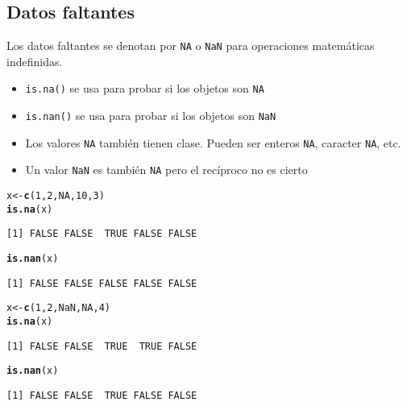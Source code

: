 \documentclass{article}\usepackage[]{graphicx}\usepackage[]{color}
\makeatletter
\newcommand{\hlnum}[1]{\textcolor[rgb]{0.686,0.059,0.569}{#1}}%
\newcommand{\hlstd}[1]{\textcolor[rgb]{0.345,0.345,0.345}{#1}}%
\newcommand{\hlkwb}[1]{\textcolor[rgb]{0.69,0.353,0.396}{#1}}%
\newcommand{\hlkwd}[1]{\textcolor[rgb]{0.737,0.353,0.396}{\textbf{#1}}}%
\newenvironment{kframe}{%
 \def\at@end@of@kframe{}%
 \ifinner\ifhmode%
  \def\at@end@of@kframe{\end{minipage}}%
  \begin{minipage}{\columnwidth}%
 \fi\fi%
 \def\FrameCommand##1{\hskip\@totalleftmargin \hskip-\fboxsep
 \colorbox{shadecolor}{##1}\hskip-\fboxsep
     \hskip-\linewidth \hskip-\@totalleftmargin \hskip\columnwidth}%
 \MakeFramed {\advance\hsize-\width
   \@totalleftmargin\z@ \linewidth\hsize
   \@setminipage}}%
 {\par\unskip\endMakeFramed%
 \at@end@of@kframe}
\newenvironment{knitrout}{}{} %
\makeatother
\begin{document}
  \subsection{Datos faltantes}
    Los datos faltantes se denotan por \texttt{NA} o \texttt{NaN} para operaciones matemáticas indefinidas.
      \begin{itemize}
        \item \texttt{is.na()} se usa para probar si los objetos son \texttt{NA}
        \item \texttt{is.nan()} se usa para probar si los objetos son \texttt{NaN}
        \item Los valores \texttt{NA} también tienen clase. Pueden ser enteros                     \texttt{NA}, caracter \texttt{NA}, etc.
        \item Un valor \texttt{NaN} es también \texttt{NA} pero el recíproco no es                 cierto
      \end{itemize}
\begin{knitrout}
\color{fgcolor}\begin{kframe}
\begin{alltt}
  \hlstd{x} \hlkwb{<-} \hlkwd{c}\hlstd{(}\hlnum{1}\hlstd{,} \hlnum{2}\hlstd{,} \hlnum{NA}\hlstd{,} \hlnum{10}\hlstd{,} \hlnum{3}\hlstd{)}
  \hlkwd{is.na}\hlstd{(x)}
\end{alltt}
\begin{verbatim}
[1] FALSE FALSE  TRUE FALSE FALSE
\end{verbatim}
\begin{alltt}
  \hlkwd{is.nan}\hlstd{(x)}
\end{alltt}
\begin{verbatim}
[1] FALSE FALSE FALSE FALSE FALSE
\end{verbatim}
\begin{alltt}
  \hlstd{x} \hlkwb{<-} \hlkwd{c}\hlstd{(}\hlnum{1}\hlstd{,} \hlnum{2}\hlstd{,} \hlnum{NaN}\hlstd{,} \hlnum{NA}\hlstd{,} \hlnum{4}\hlstd{)}
  \hlkwd{is.na}\hlstd{(x)}
\end{alltt}
\begin{verbatim}
[1] FALSE FALSE  TRUE  TRUE FALSE
\end{verbatim}
\begin{alltt}
  \hlkwd{is.nan}\hlstd{(x)}
\end{alltt}
\begin{verbatim}
[1] FALSE FALSE  TRUE FALSE FALSE
\end{verbatim}
\end{kframe}
\end{knitrout}
\end{document}
